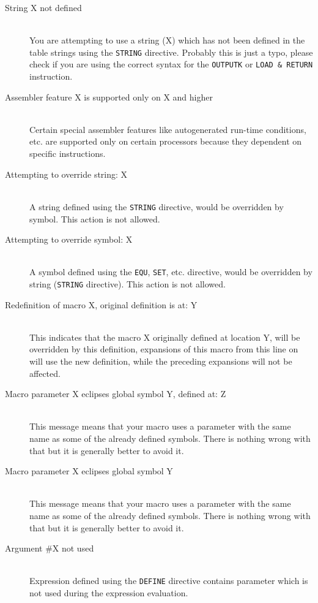 \begin{description}
        \item[String X not defined]~\\
            You are attempting to use a string (X) which has not been defined in the table strings using the \texttt{STRING} directive. Probably this is just a typo, please check if you are using the correct syntax for the \texttt{OUTPUTK} or \texttt{LOAD \& RETURN} instruction.
        \item[Assembler feature X is supported only on X and higher]~\\
            Certain special assembler features like autogenerated run-time conditions, etc. are supported only on certain processors because they dependent on specific instructions.
        \item[Attempting to override string: X]~\\
            A string defined using the \texttt{STRING} directive, would be overridden by symbol. This action is not allowed.
        \item[Attempting to override symbol: X]~\\
            A symbol defined using the \texttt{EQU}, \texttt{SET}, etc. directive, would be overridden by string (\texttt{STRING} directive). This action is not allowed.
        \item[Redefinition of macro X, original definition is at: Y]~\\
            This indicates that the macro X originally defined at location Y, will be overridden by this definition, expansions of this macro from this line on will use the new definition, while the preceding expansions will not be affected.
        \item[Macro parameter X eclipses global symbol Y, defined at: Z]~\\
            This message means that your macro uses a parameter with the same name as some of the already defined symbols. There is nothing wrong with that but it is generally better to avoid it.
        \item[Macro parameter X eclipses global symbol Y]~\\
            This message means that your macro uses a parameter with the same name as some of the already defined symbols. There is nothing wrong with that but it is generally better to avoid it.
        \item[Argument \#X not used]~\\
            Expression defined using the \texttt{DEFINE} directive contains parameter which is not used during the expression evaluation.

\end{description}
